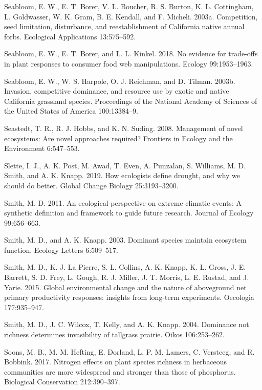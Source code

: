 \documentclass[twoside,12pt,final]{ucthesis-CA2012}
\newlength{\cslhangindent}
\newenvironment{cslreferences}%
  {\setlength{\parindent}{0pt}%
  \everypar{\setlength{\hangindent}{\cslhangindent}}\ignorespaces}%
  {\par}
\begin{document}
\begin{ucmainmatter}
\begin{cslreferences}
\leavevmode\hypertarget{ref-Seabloom2003}{}%
Seabloom, E. W., E. T. Borer, V. L. Boucher, R. S. Burton, K. L. Cottingham, L. Goldwasser, W. K. Gram, B. E. Kendall, and F. Micheli. 2003a. Competition, seed limitation, disturbance, and reestablishment of California native annual forbs. Ecological Applications 13:575--592.

\leavevmode\hypertarget{ref-Seabloom2018}{}%
Seabloom, E. W., E. T. Borer, and L. L. Kinkel. 2018. No evidence for trade-offs in plant responses to consumer food web manipulations. Ecology 99:1953--1963.

\leavevmode\hypertarget{ref-Seabloom2003a}{}%
Seabloom, E. W., W. S. Harpole, O. J. Reichman, and D. Tilman. 2003b. Invasion, competitive dominance, and resource use by exotic and native California grassland species. Proceedings of the National Academy of Sciences of the United States of America 100:13384--9.

\leavevmode\hypertarget{ref-Seastedt2008}{}%
Seastedt, T. R., R. J. Hobbs, and K. N. Suding. 2008. Management of novel ecosystems: Are novel approaches required? Frontiers in Ecology and the Environment 6:547--553.

\leavevmode\hypertarget{ref-Slette2019}{}%
Slette, I. J., A. K. Post, M. Awad, T. Even, A. Punzalan, S. Williams, M. D. Smith, and A. K. Knapp. 2019. How ecologists define drought, and why we should do better. Global Change Biology 25:3193--3200.

\leavevmode\hypertarget{ref-Smith2011b}{}%
Smith, M. D. 2011. An ecological perspective on extreme climatic events: A synthetic definition and framework to guide future research. Journal of Ecology 99:656--663.

\leavevmode\hypertarget{ref-Smith2003}{}%
Smith, M. D., and A. K. Knapp. 2003. Dominant species maintain ecosystem function. Ecology Letters 6:509--517.

\leavevmode\hypertarget{ref-Smith2015}{}%
Smith, M. D., K. J. La Pierre, S. L. Collins, A. K. Knapp, K. L. Gross, J. E. Barrett, S. D. Frey, L. Gough, R. J. Miller, J. T. Morris, L. E. Rustad, and J. Yarie. 2015. Global environmental change and the nature of aboveground net primary productivity responses: insights from long-term experiments. Oecologia 177:935--947.

\leavevmode\hypertarget{ref-Smith2004}{}%
Smith, M. D., J. C. Wilcox, T. Kelly, and A. K. Knapp. 2004. Dominance not richness determines invasibility of tallgrass prairie. Oikos 106:253--262.

\leavevmode\hypertarget{ref-Soons2017}{}%
Soons, M. B., M. M. Hefting, E. Dorland, L. P. M. Lamers, C. Versteeg, and R. Bobbink. 2017. Nitrogen effects on plant species richness in herbaceous communities are more widespread and stronger than those of phosphorus. Biological Conservation 212:390--397.


\end{cslreferences}
\end{ucmainmatter}
\end{document}
